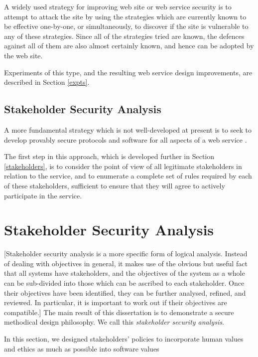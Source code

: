 A widely used strategy for improving web site or web service security is
to attempt to attack the site by using the strategies which are currently
known to be effective one-by-one, or simultaneously, to discover if the
site is vulnerable to any of these strategies. Since all of the strategies
tried are known, the defences against all of them are also almost certainly
known, and hence can be adopted by the web site.

Experiments of this type, and the resulting web service design improvements,
are described in Section \ref{expts}.



\subsection{Stakeholder Security Analysis}\label{stsecanal}

A more fundamental strategy which is not well-developed at present is
to seek to develop provably secure protocols and software for all aspects
of a web service \cite{whitman2011principles,mailloux2018examination,bishop2005introduction}.

The first step in this approach, which is developed further in 
Section \ref{stakeholders}, is to consider the point of view of all legitimate stakeholders
in relation to the service, and to enumerate a complete set of rules
required by each of these stakeholders, sufficient to ensure that they
will agree to actively participate in the service.


\section{Stakeholder Security Analysis}

[Stakeholder security analysis is a more specific form of logical analysis. Instead of dealing with
objectives in general, it makes use of the obvious but useful fact that all systems have
stakeholders, and the objectives of the system as a whole can be sub-divided into those
which can be ascribed to each stakeholder. Once their objectives have been identified, they
can be further analysed, refined, and reviewed. In particular, it is important to work out if
their objectives are compatible.]
The main result of this dissertation is to demonstrate  a secure methodical design philosophy.
We call this {\em stakeholder security analysis}.

In this section, we designed stakeholders' policies to incorporate human
values and ethics as much as possible into software values

